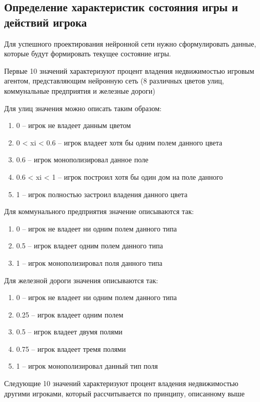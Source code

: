 \subsection{Определение характеристик состояния игры и действий игрока}
Для успешного проектирования нейронной сети нужно сформулировать данные, которые будут формировать текущее состояние игры.

Первые 10 значений характеризуют процент владения недвижимостью игровым агентом, представляющим нейронную сеть (8 различных цветов улиц, коммунальные предприятия и железные дороги)

Для улиц значения можно описать таким образом:
\begin{spacing}{0.9}
\begin{enumerate}
    \item 0 – игрок не владеет данным цветом
    \item 0 < xi < 0.6 – игрок владеет хотя бы одним полем данного цвета
    \item 0.6 – игрок монополизировал данное поле
    \item 0.6 < xi < 1 – игрок построил хотя бы один дом на поле данного
    \item 1 – игрок полностью застроил владения данного цвета 
\end{enumerate}
\end{spacing}
Для коммунального предприятия значение описываются так:
\begin{spacing}{0.9}
\begin{enumerate}
    \item 0 – игрок не владеет ни одним полем данного типа
    \item 0.5 – игрок владеет одним полем данного типа
    \item 1 – игрок монополизировал поля данного типа
\end{enumerate}
\end{spacing}
Для железной дороги значения описываются так:
\begin{spacing}{0.9}
\begin{enumerate}
    \item 0 – игрок не владеет ни одним полем данного типа
    \item 0.25 – игрок владеет одним полем
    \item 0.5 – игрок владеет двумя полями 
    \item 0.75 – игрок владеет тремя полями
    \item 1 – игрок монополизировал данный тип поля
\end{enumerate}
\end{spacing}
Следующие 10 значений характеризуют процент владения недвижимостью другими игроками, который рассчитывается по принципу, описанному выше

